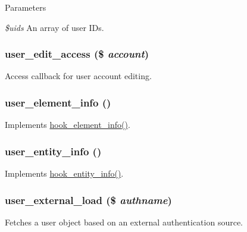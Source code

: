 \begin{DoxyParams}{Parameters}
\item[{\em \$uids}]An array of user IDs. \end{DoxyParams}
\hypertarget{user_8module_a9d988b07d458af21fe4e11868052b345}{
\subsubsection[{user\_\-edit\_\-access}]{\setlength{\rightskip}{0pt plus 5cm}user\_\-edit\_\-access (\$ {\em account})}}
\label{user_8module_a9d988b07d458af21fe4e11868052b345}
Access callback for user account editing. \hypertarget{user_8module_a39be89fedb1ce14ba1c97852daa0f7f7}{
\subsubsection[{user\_\-element\_\-info}]{\setlength{\rightskip}{0pt plus 5cm}user\_\-element\_\-info ()}}
\label{user_8module_a39be89fedb1ce14ba1c97852daa0f7f7}
Implements \hyperlink{group__hooks_ga3c5182432eddc82f8b7845e66a365d51}{hook\_\-element\_\-info()}. \hypertarget{user_8module_a1dd64aa2b09d172ccab380135acb6af4}{
\subsubsection[{user\_\-entity\_\-info}]{\setlength{\rightskip}{0pt plus 5cm}user\_\-entity\_\-info ()}}
\label{user_8module_a1dd64aa2b09d172ccab380135acb6af4}
Implements \hyperlink{group__hooks_gaf02318e9d0e8cdbf6d187b271b9969a8}{hook\_\-entity\_\-info()}. \hypertarget{user_8module_a52fec3f0dbb0e33fed3d88a58453b0f4}{
\subsubsection[{user\_\-external\_\-load}]{\setlength{\rightskip}{0pt plus 5cm}user\_\-external\_\-load (\$ {\em authname})}}
\label{user_8module_a52fec3f0dbb0e33fed3d88a58453b0f4}
Fetches a user object based on an external authentication source.


